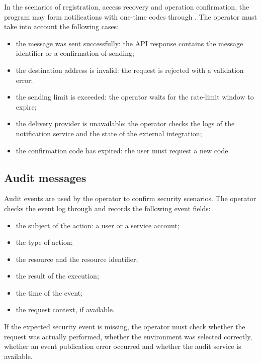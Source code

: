 \documentclass[12pt,a4paper]{extarticle}
\begin{document}
\begin{hseExample}
In the scenarios of registration, access recovery and operation confirmation, the program may form notifications with one-time codes through . The operator must take into account the following cases:

\begin{itemize}[leftmargin=1.25cm]
    \item the message was sent successfully: the API response contains the message identifier or a confirmation of sending;
    \item the destination address is invalid: the request is rejected with a validation error;
    \item the sending limit is exceeded: the operator waits for the rate-limit window to expire;
    \item the delivery provider is unavailable: the operator checks the logs of the notification service and the state of the external integration;
    \item the confirmation code has expired: the user must request a new code.
\end{itemize}
\end{hseExample}

\subsection{Audit messages}

\begin{hseExample}
Audit events are used by the operator to confirm security scenarios. The operator checks the event log through  and records the following event fields:

\begin{itemize}[leftmargin=1.25cm]
    \item the subject of the action: a user or a service account;
    \item the type of action;
    \item the resource and the resource identifier;
    \item the result of the execution;
    \item the time of the event;
    \item the request context, if available.
\end{itemize}

If the expected security event is missing, the operator must check whether the request was actually performed, whether the environment was selected correctly, whether an event publication error occurred and whether the audit service is available.
\end{hseExample}
\end{document}
